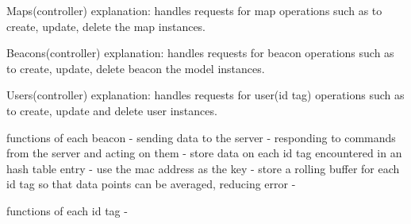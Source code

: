 Maps(controller)
	explanation: handles requests for map operations such as to create, update, delete the map instances.

Beacons(controller)
	explanation: handles requests for beacon operations such as to create, update, delete beacon the model instances.

Users(controller)
	explanation: handles requests for user(id tag) operations such as to create, update and delete user instances.

\bigskip

functions of each beacon
	- sending data to the server
	- responding to commands from the server and acting on them
	- store data on each id tag encountered in an hash table entry - use the mac address as the key
	- store a rolling buffer for each id tag so that data points can be averaged, reducing error
	-

\bigskip

functions of each id tag
	-




